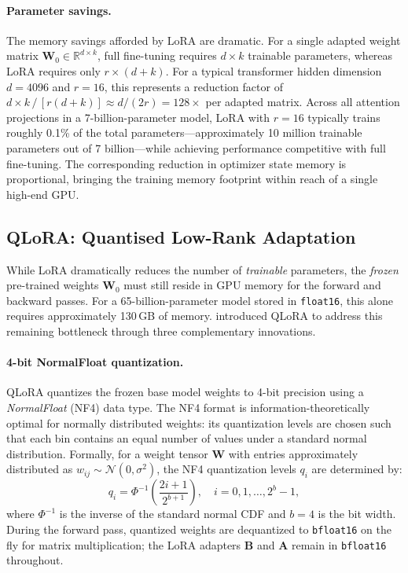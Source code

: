 \paragraph{Parameter savings.}
The memory savings afforded by LoRA are dramatic.  For a single adapted
weight matrix $\mathbf{W}_0 \in \mathbb{R}^{d \times k}$, full
fine-tuning requires $d \times k$ trainable parameters, whereas LoRA
requires only $r \times (d + k)$.  For a typical transformer hidden
dimension $d = 4096$ and $r = 16$, this represents a reduction factor
of $d \times k \,/\, [r(d+k)] \approx d / (2r) = 128\times$ per
adapted matrix.  Across all attention projections in a 7-billion-parameter
model, LoRA with $r = 16$ typically trains roughly 0.1\% of the total
parameters---approximately 10 million trainable parameters out of 7
billion---while achieving performance competitive with full fine-tuning.
The corresponding reduction in optimizer state memory is proportional,
bringing the training memory footprint within reach of a single
high-end GPU.

\subsection{QLoRA: Quantised Low-Rank Adaptation}
\label{sec:qlora}

While LoRA dramatically reduces the number of \emph{trainable} parameters,
the \emph{frozen} pre-trained weights $\mathbf{W}_0$ must still reside in
GPU memory for the forward and backward passes.  For a 65-billion-parameter
model stored in \texttt{float16}, this alone requires approximately 130\,GB
of memory.  \citet{dettmers2023qlora} introduced QLoRA to address this
remaining bottleneck through three complementary innovations.

\paragraph{4-bit NormalFloat quantization.}
QLoRA quantizes the frozen base model weights to 4-bit precision using
a \emph{NormalFloat} (NF4) data type.  The NF4 format is
information-theoretically optimal for normally distributed weights: its
quantization levels are chosen such that each bin contains an equal
number of values under a standard normal distribution.  Formally, for a
weight tensor $\mathbf{W}$ with entries approximately distributed as
$w_{ij} \sim \mathcal{N}(0, \sigma^2)$, the NF4 quantization levels
$q_i$ are determined by:
\begin{equation}
  q_i = \Phi^{-1}\!\left(\frac{2i + 1}{2^{b+1}}\right), \quad
  i = 0, 1, \ldots, 2^b - 1,
\end{equation}
where $\Phi^{-1}$ is the inverse of the standard normal CDF and $b = 4$
is the bit width.  During the forward pass, quantized weights are
dequantized to \texttt{bfloat16} on the fly for matrix multiplication;
the LoRA adapters $\mathbf{B}$ and $\mathbf{A}$ remain in
\texttt{bfloat16} throughout.

